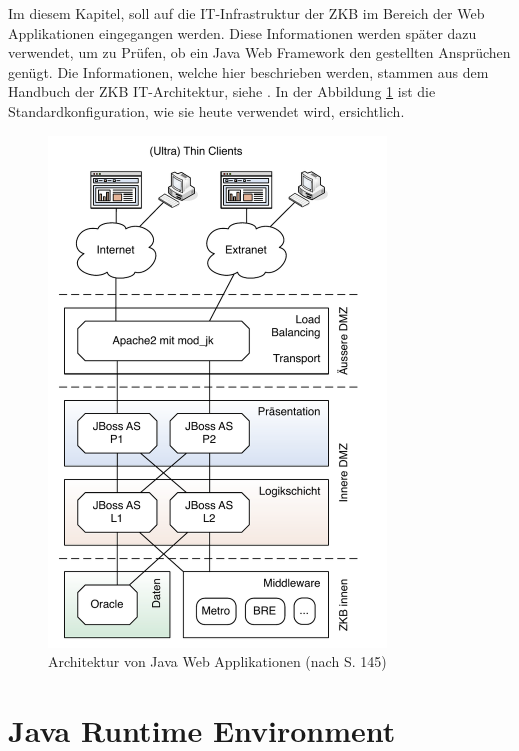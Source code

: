   Im diesem Kapitel, soll auf die IT-Infrastruktur der \ac{ZKB} im Bereich der
  Web Applikationen eingegangen werden. Diese Informationen werden später dazu
  verwendet, um zu Prüfen, ob ein Java Web Framework den gestellten Ansprüchen
  genügt. Die Informationen, welche hier beschrieben werden, stammen aus dem
  Handbuch der ZKB IT-Architektur, siehe \cite{ZkbHandbuchDerItArchitektur}. In
  der Abbildung \ref{img:infrastrukturZkb} ist die Standardkonfiguration, wie
  sie heute verwendet wird, ersichtlich.
  
  \begin{figure}[hbtp]
    \begin{center}
      \includegraphics[width=0.80\textwidth]{./image/infrastrukturZkb.pdf}
      \caption{Architektur von Java Web Applikationen (nach
      \cite{ZkbHandbuchDerItArchitektur} S. 145)}
      \label{img:infrastrukturZkb}
    \end{center}
  \end{figure}
  
  \section{Java Runtime Environment}
  
